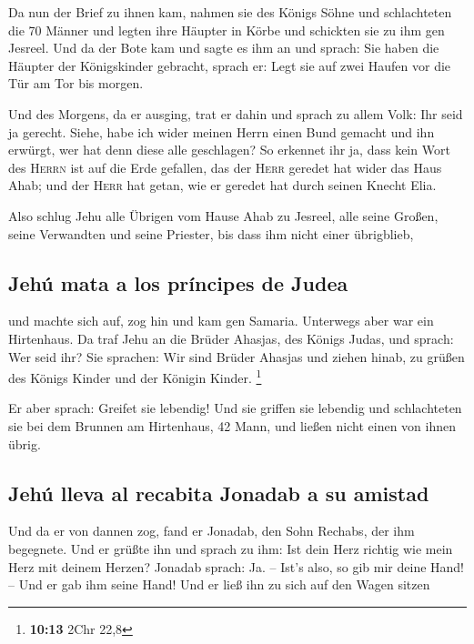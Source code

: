  Da nun der Brief zu ihnen kam, nahmen sie des Königs
Söhne und schlachteten die 70 Männer und legten ihre Häupter in Körbe
und schickten sie zu ihm gen Jesreel.  Und da der Bote kam
und sagte es ihm an und sprach: Sie haben die Häupter der Königskinder
gebracht, sprach er: Legt sie auf zwei Haufen vor die Tür am Tor bis
morgen.

 Und des Morgens, da er ausging, trat er dahin und sprach
zu allem Volk: Ihr seid ja gerecht. Siehe, habe ich wider meinen Herrn
einen Bund gemacht und ihn erwürgt, wer hat denn diese alle geschlagen?
 So erkennet ihr ja, dass kein Wort des \textsc{Herrn}
ist auf die Erde gefallen, das der \textsc{Herr} geredet hat wider das
Haus Ahab; und der \textsc{Herr} hat getan, wie er geredet hat durch
seinen Knecht Elia.

 Also schlug Jehu alle Übrigen vom Hause Ahab zu Jesreel,
alle seine Großen, seine Verwandten und seine Priester, bis dass ihm
nicht einer übrigblieb,

\hypertarget{jehuxfa-mata-a-los-pruxedncipes-de-judea}{%
\subsection{Jehú mata a los príncipes de
Judea}\label{jehuxfa-mata-a-los-pruxedncipes-de-judea}}

 und machte sich auf, zog hin und kam gen Samaria.
Unterwegs aber war ein Hirtenhaus.  Da traf Jehu an die
Brüder Ahasjas, des Königs Judas, und sprach: Wer seid ihr? Sie
sprachen: Wir sind Brüder Ahasjas und ziehen hinab, zu grüßen des Königs
Kinder und der Königin Kinder. \footnote{\textbf{10:13} 2Chr 22,8}

 Er aber sprach: Greifet sie lebendig! Und sie griffen
sie lebendig und schlachteten sie bei dem Brunnen am Hirtenhaus, 42
Mann, und ließen nicht einen von ihnen übrig.

\hypertarget{jehuxfa-lleva-al-recabita-jonadab-a-su-amistad}{%
\subsection{Jehú lleva al recabita Jonadab a su
amistad}\label{jehuxfa-lleva-al-recabita-jonadab-a-su-amistad}}

 Und da er von dannen zog, fand er Jonadab, den Sohn
Rechabs, der ihm begegnete. Und er grüßte ihn und sprach zu ihm: Ist
dein Herz richtig wie mein Herz mit deinem Herzen? Jonadab sprach: Ja.
-- Ist's also, so gib mir deine Hand! -- Und er gab ihm seine Hand! Und
er ließ ihn zu sich auf den Wagen sitzen

